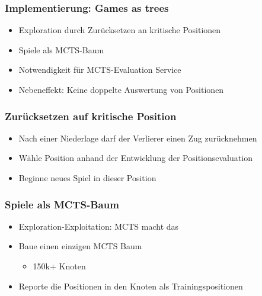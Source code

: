 \begin{frame}
 \frametitle{Implementierung: Games as trees}
  


\begin{itemize}
  \item \pause Exploration durch Zurücksetzen an kritische Positionen
  \item \pause Spiele als MCTS-Baum
  \item \pause Notwendigkeit für MCTS-Evaluation Service
  \item \pause Nebeneffekt: Keine doppelte Auswertung von Positionen
\end{itemize}


  
\end{frame}
\begin{frame}
 \frametitle{Zurücksetzen auf kritische Position}
  


\begin{itemize}
  \item \pause Nach einer Niederlage darf der Verlierer einen Zug zurücknehmen
  \item \pause Wähle Position anhand der Entwicklung der Positionsevaluation
  \item \pause Beginne neues Spiel in dieser Position
\end{itemize}

  
\end{frame}
\begin{frame}
 \frametitle{Spiele als MCTS-Baum}
  


\begin{itemize}
  \item \pause Exploration-Exploitation: MCTS macht das
  \item \pause Baue einen einzigen MCTS Baum
\begin{itemize}
  \item \pause 150k+ Knoten
\end{itemize}
  \item \pause Reporte die Positionen in den Knoten als Trainingspositionen
\end{itemize}

  
\end{frame}

